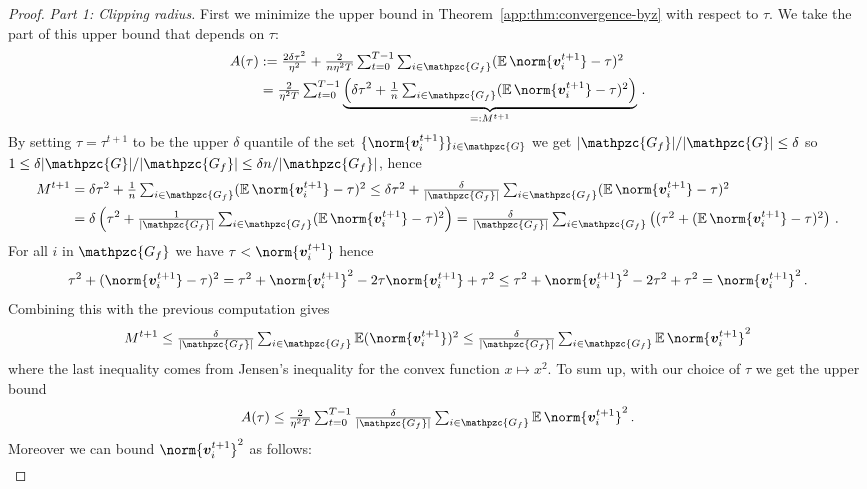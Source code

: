 \documentclass{article}
\newcommand{\gset}{\ensuremath{{\mathpzc{G}}}}
\newcommand{\gfset}{\ensuremath{{\mathpzc{G_f}}}}
\begin{document}
\begin{proof}
   \textit{Part 1: Clipping radius.} First we minimize the upper bound in Theorem~\ref{app:thm:convergence-byz} with respect to $\tau$. We take the part of this upper bound that depends on $\tau$:
  \begin{align*}
     A(\tau) 
     &:= 
     \tfrac{2\delta\tau^2}{\eta^2}
     + 
     \tfrac{2}{n \eta^2 T} \tsum_{t=0}^{T-1} \tsum_{i\in\gfset} (\E \norm{ \vv_i^{t+1} } - \tau)^2
     \\
     &=
     \tfrac{2}{\eta^2 T} \tsum_{t=0}^{T-1}
     \underbrace{\left(
       \delta\tau^2
       + 
       \tfrac{1}{n} \tsum_{i\in\gfset} (\E \norm{ \vv_i^{t+1} } - \tau)^2 
     \right)}_{=: M^{t+1}} \, .
  \end{align*}
  By setting $\tau = \tau^{t+1}$ to be the upper $\delta$ quantile of the set $\{\norm{\vv_i^{t+1}}\}_{i\in\gset}$ we get $|\gfset| / |\gset| \le \delta$ so $1 \le \delta |\gset| / |\gfset| \le \delta n / |\gfset|$,  hence
  \begin{align*}
    M^{t+1}
	&=
    \delta\tau^2
    + 
    \tfrac{1}{n} \tsum_{i\in\gfset} (\E \norm{ \vv_i^{t+1} } - \tau)^2 
    \le 
    \delta\tau^2
    + 
    \tfrac{\delta}{|\gfset|} \tsum_{i\in\gfset} (\E \norm{ \vv_i^{t+1} } - \tau)^2 
    \\
    &=
    \delta
    \left(
      \tau^2
      + 
      \tfrac{1}{|\gfset|} \tsum_{i\in\gfset} (\E \norm{ \vv_i^{t+1} } - \tau)^2 
    \right)
    =
    \tfrac{\delta}{|\gfset|} \tsum_{i\in\gfset} \left((\tau^2 + (\E \norm{ \vv_i^{t+1} } - \tau)^2 \right) \, . 
  \end{align*}
  For all $i$ in $\gfset$ we have $\tau < \norm{\vv_i^{t+1}}$ hence
  \[
    \tau^2 + (\norm{\vv_i^{t+1}} - \tau)^2 
    =
    \tau^2 + \norm{\vv_i^{t+1}}^2 - 2 \tau \norm{\vv_i^{t+1}} + \tau^2 
    \le 
    \tau^2 + \norm{\vv_i^{t+1}}^2 - 2 \tau^2 + \tau^2 
    = 
    \norm{\vv_i^{t+1}}^2 \, .
  \]
  Combining this with the previous computation gives
  \[
  M^{t+1} 
  \le
  \tfrac{\delta}{|\gfset|} \tsum_{i\in\gfset} \E (\norm{ \vv_i^{t+1}})^2
  \le
  \tfrac{\delta}{|\gfset|} \tsum_{i\in\gfset} \E \norm{ \vv_i^{t+1}}^2
  \]
  where the last inequality comes from Jensen's inequality for the convex function $x \mapsto x^2$.
  To sum up, with our choice of $\tau$ we get the upper bound
  \[
  A(\tau)
  \le 
  \tfrac{2}{\eta^2 T} \tsum_{t=0}^{T-1} \tfrac{\delta}{|\gfset|} \tsum_{i\in\gfset} \E \norm{\vv_i^{t+1}}^2
  \, .
  \]
  Moreover we can bound $\norm{\vv_i^{t+1}}^2$ as follows:
  \begin{align*}

\end{align*}
\end{proof}
\end{document}
